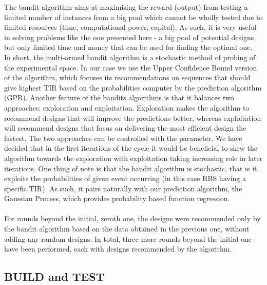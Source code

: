 \documentclass{article}
\begin{document}
The bandit algorithm aims at maximising the reward (output) from testing a limited number of instances from a big pool which cannot be wholly tested due to limited resources (time, computational power, capital). As such, it is very useful in solving problems like the one presented here - a big pool of potential designs, but only limited time and money that can be used for finding the optimal one.\\
In short, the multi-armed bandit algorithm is a stochastic method of probing of the experimental space. In our case we use the Upper Confidence Bound version of the algorithm, which focuses its recommendations on sequences that should give highest TIR based on the probabilities computer by the prediction algorithm (GPR). Another feature of the bandits algorithms is that it balances two approaches: exploration and exploitation. Exploration makes the algorithm to recommend designs that will improve the predictions better, whereas exploitation will recommend designs that focus on delivering the most efficient design the fastest. The two approaches can be controlled with the \textbeta\enspace parameter. We have decided that in the first iterations of the cycle it would be beneficial to skew the algorithm towards the exploration with exploitation taking increasing role in later iterations. One thing of note is that the bandit algorithm is stochastic, that is it exploits the probabilities of given event occurring (in this case RBS having a specific TIR). As such, it pairs naturally with our prediction algorithm, the Gaussian Process, which provides probability based function regression.\\
\\
For rounds beyond the initial, zeroth one, the designs were recommended only by the bandit algorithm based on the data obtained in the previous one, without adding any random designs. In total, three more rounds beyond the initial one have been performed, each with designs recommended by the algorithm. 

\subsection{BUILD and TEST}
\end{document}
